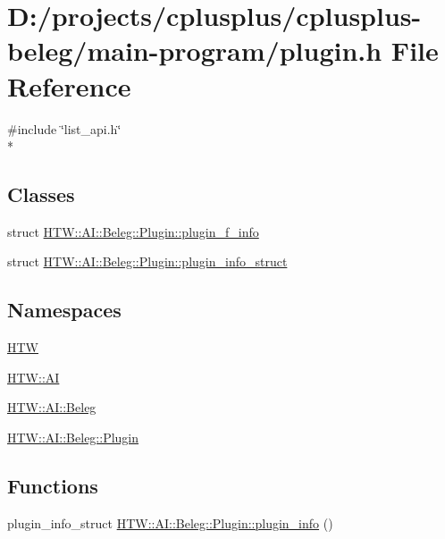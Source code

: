 \hypertarget{main-program_2plugin_8h}{\section{D\-:/projects/cplusplus/cplusplus-\/beleg/main-\/program/plugin.h File Reference}
\label{main-program_2plugin_8h}
}
{\ttfamily \#include \char`\"{}list\-\_\-api.\-h\char`\"{}}\\*
\subsection*{Classes}
\begin{DoxyCompactItemize}
\item 
struct \hyperlink{struct_h_t_w_1_1_a_i_1_1_beleg_1_1_plugin_1_1plugin__f__info}{H\-T\-W\-::\-A\-I\-::\-Beleg\-::\-Plugin\-::plugin\-\_\-f\-\_\-info}
\item 
struct \hyperlink{struct_h_t_w_1_1_a_i_1_1_beleg_1_1_plugin_1_1plugin__info__struct}{H\-T\-W\-::\-A\-I\-::\-Beleg\-::\-Plugin\-::plugin\-\_\-info\-\_\-struct}
\end{DoxyCompactItemize}
\subsection*{Namespaces}
\begin{DoxyCompactItemize}
\item 
\hyperlink{namespace_h_t_w}{H\-T\-W}
\item 
\hyperlink{namespace_h_t_w_1_1_a_i}{H\-T\-W\-::\-A\-I}
\item 
\hyperlink{namespace_h_t_w_1_1_a_i_1_1_beleg}{H\-T\-W\-::\-A\-I\-::\-Beleg}
\item 
\hyperlink{namespace_h_t_w_1_1_a_i_1_1_beleg_1_1_plugin}{H\-T\-W\-::\-A\-I\-::\-Beleg\-::\-Plugin}
\end{DoxyCompactItemize}
\subsection*{Functions}
\begin{DoxyCompactItemize}
\item 
plugin\-\_\-info\-\_\-struct \hyperlink{namespace_h_t_w_1_1_a_i_1_1_beleg_1_1_plugin_a09f048dbac5b6f35fca9900b50aa9224}{H\-T\-W\-::\-A\-I\-::\-Beleg\-::\-Plugin\-::plugin\-\_\-info} ()
\end{DoxyCompactItemize}
